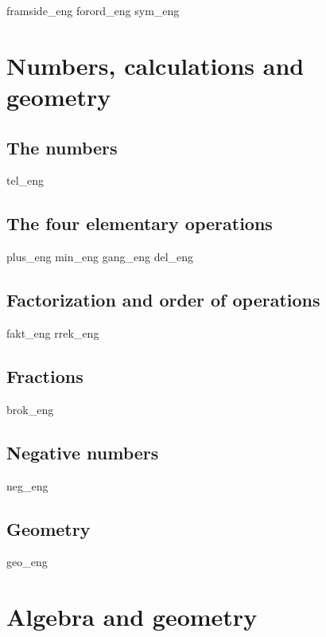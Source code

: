




{framside_eng}
{forord_eng}
{sym_eng}
\newpage

{\footnotesize \tableofcontents}
\newpage
\part{Numbers, calculations and geometry \label{Del1}}

\chapter{The numbers \label{Talavare}}
\newpage
{tel_eng}
%
\chapter{The four elementary operations \label{Rekneartane}}
\newpage
{plus_eng}
{min_eng}
{gang_eng}
{del_eng}
\chapter{Factorization and order of operations}
\newpage
{fakt_eng}
{rrek_eng}

\chapter{Fractions}
\newpage
{brok_eng}

\chapter{Negative numbers \label{Negtal}}
\newpage
{neg_eng}


\chapter{Geometry}
\newpage
{geo_eng}

\part{Algebra and geometry \label{Del2}}
